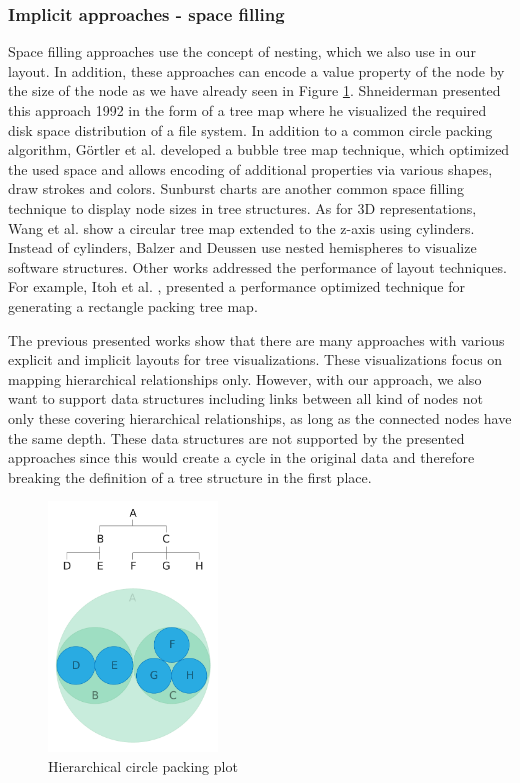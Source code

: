 \subsubsection{Implicit approaches - space filling}
Space filling approaches use the concept of nesting, which we also use in our layout. In addition, these approaches can encode a value property of the node by the size of the node as we have already seen in Figure \ref{fig:hierarchicalCirclePlot}.
Shneiderman \cite{shneiderman_tree_1992} presented this approach 1992 in the form of a tree map where he visualized the required disk space distribution of a file system. In addition to a common circle packing algorithm, Görtler et al. \cite{gortler_bubble_2018} developed a bubble tree map technique, which optimized the used space and allows encoding of additional properties via various shapes, draw strokes and colors. Sunburst charts are another common space filling technique to display node sizes in tree structures. 
As for 3D representations, Wang et al. \cite{wang_visualization_2006} show a circular tree map extended to the z-axis using cylinders. Instead of cylinders, Balzer and Deussen \cite{balzer_hierarchy_2004} use nested hemispheres to visualize software structures.
Other works addressed the performance of layout techniques. For example, Itoh et al. \cite{itoh_hierarchical_2004}, presented a performance optimized technique for generating a rectangle packing tree map.

The previous presented works show that there are many approaches with various explicit and implicit layouts for tree visualizations. These visualizations focus on mapping hierarchical relationships only. 
However, with our approach, we also want to support data structures including links between all kind of nodes not only these covering hierarchical relationships, as long as the connected nodes have the same depth. These data structures are not supported by the presented approaches since this would create a cycle in the original data and therefore breaking the definition of a tree structure in the first place.

\begin{figure}[!hbt]
    \centering
    \includegraphics[width=0.40\textwidth, trim={0 0 0 4.3cm},clip]{graphics/circle_packing.pdf}
    \caption{Hierarchical circle packing plot \cite{ribecca_circle_nodate}}
    \label{fig:hierarchicalCirclePlot}
\end{figure}

